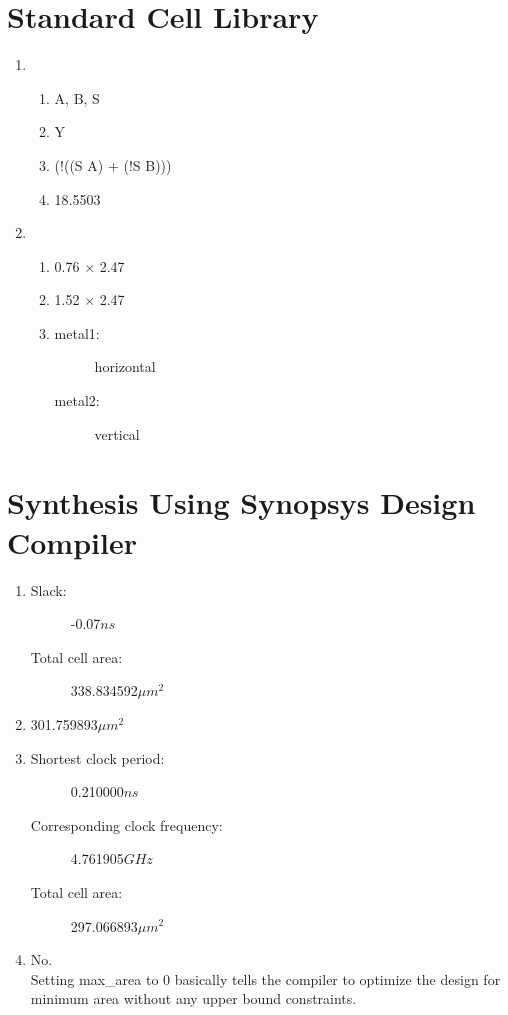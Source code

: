 \documentclass[12pt, a4paper]{article}
\begin{document}
\setcounter{section}{1}
\section{Standard Cell Library}


\begin{enumerate}[label=\arabic*.]
      \item 
      \begin{enumerate}
        \item A, B, S
        \item Y
        \item (!((S A) + (!S B)))
        \item 18.5503
      \end{enumerate}
      \item 
      \begin{enumerate}
        \item 0.76 $\times$ 2.47
        \item 1.52 $\times$ 2.47
        \item \begin{description}
            \item[metal1:] horizontal
            \item[metal2:] vertical
        \end{description}
      \end{enumerate}
\end{enumerate}

\section{Synthesis Using Synopsys Design Compiler}
\begin{enumerate}
    \item 
    \begin{description}
        \item[Slack:] -0.07$ns$
        \item[Total cell area:] 338.834592$\mu m^2$
    \end{description}
    \item 301.759893$\mu m^2$
    \item 
    \begin{description}
        \item[Shortest clock period:] 0.210000$ns$
        \item[Corresponding clock frequency:] 4.761905$GHz$
        \item[Total cell area:] 297.066893$\mu m^2$
    \end{description}
    \item No. \\Setting max\_area to 0 basically tells the compiler to optimize 
    the design for minimum area without any upper bound constraints. 
\end{enumerate}
\end{document}
